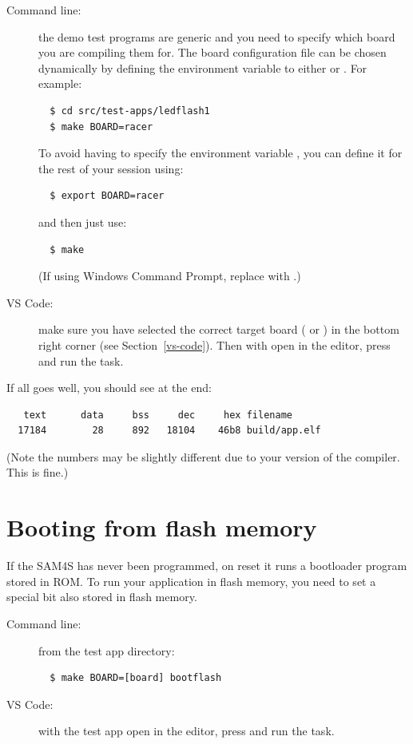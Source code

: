 \begin{description}
  \item[Command line:] the demo test programs are generic and you need
  to specify which board you are compiling them for. The board
  configuration file can be chosen dynamically by defining the
  environment variable  to either  or
  . For example:
  \begin{verbatim}
  $ cd src/test-apps/ledflash1
  $ make BOARD=racer
  \end{verbatim}

  To avoid having to specify the environment variable , you
  can define it for the rest of your session using:
  \begin{verbatim}
  $ export BOARD=racer
  \end{verbatim}
  and then just use:
  \begin{verbatim}
  $ make
  \end{verbatim}
  (If using Windows Command Prompt, replace  with .)

  \item[VS Code:] make sure you have selected the correct target board
  ( or ) in the bottom right corner (see
  Section~\ref{vs-code}). Then with  open in the editor,
  press  and run the  task.
\end{description}

If all goes well, you should see at the end:
\begin{verbatim}
   text      data     bss     dec     hex filename
  17184        28     892   18104    46b8 build/app.elf
\end{verbatim}
(Note the numbers may be slightly different due to your version of the
compiler.  This is fine.)


\section{Booting from flash memory}
\label{booting-from-flash-memory}

If the SAM4S has never been programmed, on reset it runs a bootloader
program stored in ROM.  To run your application in flash memory, you
need to set a special bit also stored in flash memory.

\begin{description}
  \item[Command line:] from the test app directory:
  \begin{verbatim}
  $ make BOARD=[board] bootflash
  \end{verbatim}

  \item[VS Code:] with the test app open in the editor, press
   and run the  task.
\end{description}

